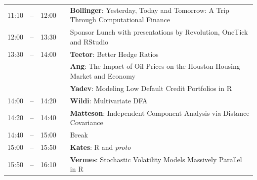 \documentclass[letterpaper,10pt]{article}
\newcommand{\mylinecolor}[1]{\color{#1}\vspace{-8pt}}  %
\begin{document}
\begin{tabular}{rlrlp{5in}}
  11:10 & -- & 12:00 &   & \textbf{\color{KeynoteTalk} Bollinger}: \small{Yesterday, Today and Tomorrow: A Trip Through Computational Finance} \\
  12:00 & -- &  13:30 &   & \small{\mylinecolor{Breaks}  Sponsor Lunch with presentations by Revolution, OneTick and RStudio}  \\
   13:30 & -- &  14:00 &   & \textbf{\color{LightningTalk} Teetor}: \small{Better Hedge Ratios} \\
          &    &         &   & \textbf{\color{LightningTalk} Ang}: \small{The Impact of Oil Prices on the Houston Housing Market and Economy} \\
          &    &         &   & \textbf{\color{LightningTalk} Yadev}: \small{Modeling Low Default Credit Portfolios in R} \\
  14:00  & -- &  14:20 &   & \textbf{\color{Talk} Wildi}: \small{Multivariate DFA} \\
  14:20  & -- &  14:40 &   & \textbf{\color{Talk} Matteson}: \small{Independent Component Analysis via Distance Covariance} \\
   14:40 & -- & 15:00  &   & \small{\mylinecolor{Breaks} Break} \\
   15:00 & -- & 15:50  &   & \textbf{\color{KeynoteTalk} Kates}: \small{R and \emph{proto}} \\
   15:50 & -- & 16:10  &   & \textbf{\color{Talk} Vermes}: \small{Stochastic Volatility Models Massively Parallel in R} \\

\end{tabular}
\end{document}

